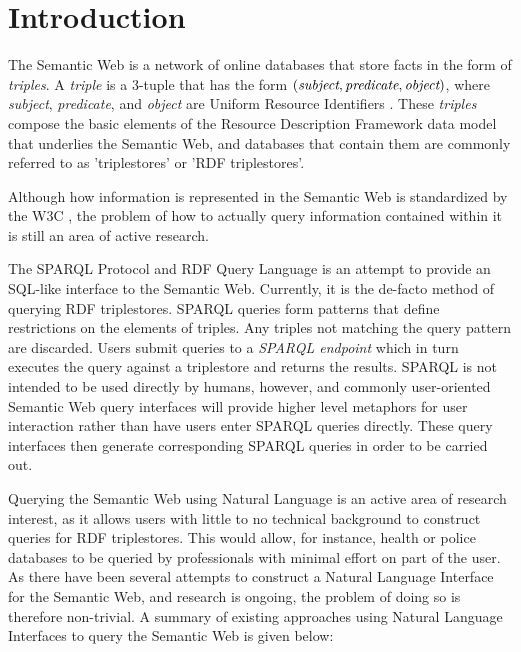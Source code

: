 \documentclass[../main.tex]{subfiles}
\begin{document}
\chapter{Introduction}


The Semantic Web is a network of online databases that store facts in the form of {\em triples}.  A {\em triple} is a 3-tuple that has the form $(\text{\em subject}, \text{\em predicate}, \text{\em object})$, where {\em subject}, {\em predicate}, and {\em object} are Uniform Resource Identifiers \cite{rdf}.  These {\em triples} compose the basic elements of the Resource Description Framework data model that underlies the Semantic Web, and databases that contain them are commonly referred to as 'triplestores' or 'RDF triplestores'.


Although how information is represented in the Semantic Web is standardized by the W3C \cite{w3csemanticweb}, the problem of how to actually query information contained within it is still an area of active research.

The SPARQL Protocol and RDF Query Language is an attempt to provide an SQL-like interface to the Semantic Web.  Currently, it is the de-facto method of querying RDF triplestores.  SPARQL queries form patterns that define restrictions on the elements of triples.  Any triples not matching the query pattern are discarded.  Users submit queries to a {\em SPARQL endpoint} which in turn executes the query against a triplestore and returns the results.  SPARQL is not intended to be used directly by humans, however, and commonly user-oriented Semantic Web query interfaces will provide higher level metaphors for user interaction rather than have users enter SPARQL queries directly.  These query interfaces then generate corresponding SPARQL queries in order to be carried out.

Querying the Semantic Web using Natural Language is an active area of research interest, as it allows users with little to no technical background to construct queries for RDF triplestores.  This would allow, for instance, health or police databases to be queried by professionals with minimal effort on part of the user.  As there have been several attempts to construct a Natural Language Interface for the Semantic Web, and research is ongoing, the problem of doing so is therefore non-trivial.  A summary of existing approaches using Natural Language Interfaces to query the Semantic Web is given below:
\end{document}
